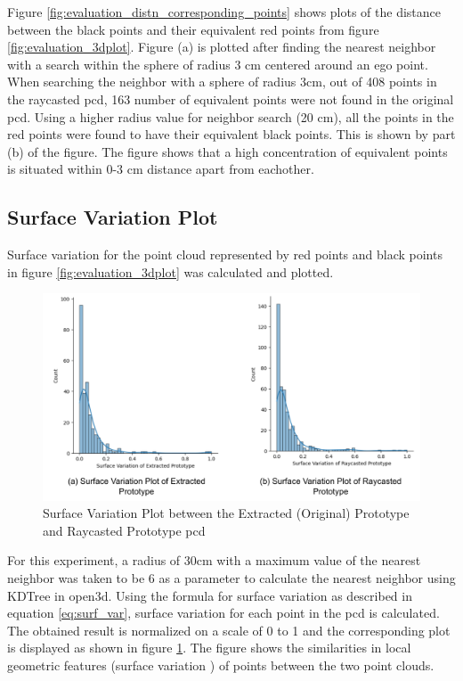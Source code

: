 Figure \ref{fig:evaluation_distn_corresponding_points} shows plots of the distance between the black points and their equivalent red points from figure \ref{fig:evaluation_3dplot}. Figure (a) is plotted after finding the nearest neighbor with a search within the sphere of radius 3 cm centered around an ego point. When searching the neighbor with a sphere of radius 3cm, out of 408 points in the raycasted \acrshort{pcd}, 163 number of equivalent points were not found in the original \acrshort{pcd}. Using a higher radius value for neighbor search (20 cm), all the points in the red points were found to have their equivalent black points. This is shown by part (b) of the figure. The figure shows that a high concentration of equivalent points is situated within 0-3 cm distance apart from eachother.

\subsection{Surface Variation Plot}
Surface variation for the point cloud represented by red points and black points in figure \ref{fig:evaluation_3dplot} was calculated and plotted.

\begin{figure}[htbp]
    \centering
    \includegraphics[width=1\linewidth]{97_graphics/evaluation/sv_plots.pdf}
    \caption{Surface Variation Plot between the Extracted (Original) Prototype and Raycasted Prototype \acrshort{pcd}}
    \label{fig:evaluation-sv_plots}
\end{figure}

For this experiment, a radius of 30cm with a maximum value of the nearest neighbor was taken to be 6 as a parameter to calculate the nearest neighbor using KDTree in open3d. Using the formula for surface variation as described in equation \ref{eq:surf_var}, surface variation for each point in the \acrshort{pcd} is calculated. The obtained result is normalized on a scale of 0 to 1 and the corresponding plot is displayed as shown in figure \ref{fig:evaluation-sv_plots}. The figure shows the similarities in local geometric features (surface variation ) of points between the two point clouds.


